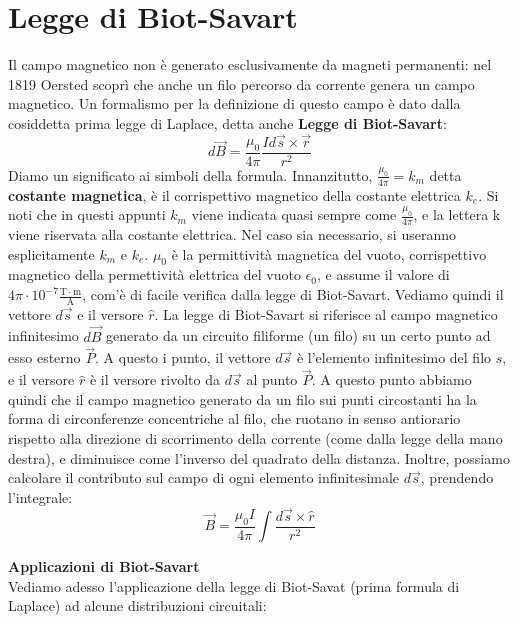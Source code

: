 \documentclass[a4paper,12pt]{article}
\begin{document}
\section{Legge di Biot-Savart}
Il campo magnetico non è generato esclusivamente da magneti permanenti: nel 1819 Oersted scoprì che anche un filo percorso da corrente
genera un campo magnetico. Un formalismo per la definizione di questo campo è dato dalla cosiddetta prima legge di Laplace, detta anche \textbf{Legge di Biot-Savart}:
$$ d\vec{B} = \frac{\mu_0}{4\pi} \frac{Id\vec{s} \times \vec{r}}{r^2} $$
Diamo un significato ai simboli della formula. Innanzitutto, $\frac{\mu_0}{4\pi} = k_m$ detta \textbf{costante magnetica}, è il corrispettivo
magnetico della costante elettrica $k_e$. Si noti che in questi appunti $k_m$ viene indicata quasi sempre come $\frac{\mu_0}{4\pi}$, e la
lettera k viene riservata alla costante elettrica. Nel caso sia necessario, si useranno esplicitamente $k_m$ e $k_e$. $\mu_0$ è la permittività
magnetica del vuoto, corrispettivo magnetico della permettività elettrica del vuoto $\epsilon_0$, e assume il valore di $4\pi \cdot 10^{-7} \frac{\mathrm{T} \cdot \mathrm{m}}{\mathrm{A}}$, com'è di
facile verifica dalla legge di Biot-Savart. Vediamo quindi il vettore $d\vec{s}$ e il versore $\hat{r}$. La legge di Biot-Savart si riferisce
al campo magnetico infinitesimo $d\vec{B}$ generato da un circuito filiforme (un filo) su un certo punto ad esso esterno $\vec{P}$. A questo i punto, il vettore
$d\vec{s}$ è l'elemento infinitesimo del filo $s$, e il versore $\hat{r}$ è il versore rivolto da $ d\vec{s}$ al punto $\vec{P}$. A questo punto abbiamo
quindi che il campo magnetico generato da un filo sui punti circostanti ha la forma di circonferenze concentriche al filo, che ruotano in senso antiorario rispetto alla direzione
di scorrimento della corrente (come dalla legge della mano destra), e diminuisce come l'inverso del quadrato della distanza. Inoltre, possiamo calcolare il contributo sul campo di ogni elemento infinitesimale $d\vec{s}$, prendendo
l'integrale:
$$ \vec{B} = \frac{\mu_0 I}{4\pi} \int \frac{d\vec{s} \times \hat{r}}{r^2} $$
\par\smallskip
\textbf{Applicazioni di Biot-Savart} \\
Vediamo adesso l'applicazione della legge di Biot-Savat (prima formula di Laplace) ad alcune distribuzioni circuitali:
\end{document}
